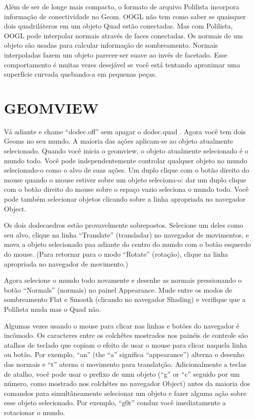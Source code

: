 \documentclass[12pt,a4paper]{book}
\begin{document}
Al\'em de ser de longe mais compacto, o formato de arquivo Polilista incorpora
informa\c{c}\~ao de conectividade no Geom.  OOGL n\~ao tem como saber
se quaisquer dois quadril\'ateros em um objeto Quad est\~ao conectadas.  Mas
com Polilista, OOGL pode interpolar normais atrav\'es de faces conectadas.
Os normais de um objeto s\~ao usadas para calcular informa\c{c}\~ao de sombreamento.
Normais interpoladas fazem um objeto parecer-ser suave ao inv\'es de facetado.
Esse comportamento \'e muitas vezes desej\'avel se voc\^e est\'a tentando aproximar uma superf\'icie
curvada quebando-a em pequenas pe\c{c}as.

\section{GEOMVIEW}

V\'a adiante e chame ``dodec.off'' sem apagar o dodec.quad .  Agora
voc\^e tem dois Geoms no seu mundo.  A maioria das a\c{c}\~oes aplicam-se ao
objeto atualmente selecionado. Quando voc\^e inicia o geomview, o objeto
atualmente selecionado \'e o mundo todo. Voc\^e pode independentemente controlar qualquer
objeto no mundo selecionado-o como o alvo de suas a\c{c}\~oes.
Um duplo clique com o bot\~ao direito do mouse quando o mouse estiver sobre um
objeto seleciona-o: dar um duplo clique com o bot\~ao direito do mouse sobre o espa\c{c}o vazio
seleciona o mundo todo. Voc\^e pode tamb\'em selecionar objetos clicando sobre a
linha apropriada no navegador Object.

Os dois dodecaedros est\~ao provavelmente sobrepostos.  Selecione um deles como
seu alvo, clique na linha ``Translate'' (transladar) no navegador de movimentos, e
mova a objeto selecionado paa adiante do centro do mundo com o bot\~ao esquerdo
do mouse.  (Para retornar para o modo ``Rotate'' (rota\c{c}\~ao), clique na linha apropriada no
navegador de movimento.)
 
Agora selecione o mundo todo novamente e desenhe as normais pressionando o
bot\~ao ``Normals'' (normais) no painel Appearance. Mude entre os modos de sombreamento
Flat e Smooth (clicando no navegador Shading) e verifique
que a Polilista muda mas o Quad n\~ao.  

Algumas vezes usando o mouse para clicar nas linhas e bot\~oes do navegador \'e
inc\^omodo. Os caracteres entre os colch\^etes mostrados nos pain\'eis de controle s\~ao
atalhos de teclado que copiam o efeito de usar o mouse para
clicar naquela linha ou bot\~ao. Por exemplo, ``an'' (the ``a'' significa
``appearance'') alterna o desenho das normais e ``t'' aterna o movimento para
translat\c{c}\~ao.  Adicionalmente a teclas de atalho, voc\^e pode usar o prefixo de umn
objeto (``g'' or ``c'' seguido por um n\'umero, como mostrado nos colch\^etes no
navegador Object) antes da maioria dos comandos para simult\^aneamente selecionar um objeto
e fazer alguma a\c{c}\~ao sobre esse objeto selecionado. Por exemplo, ``g0r'' conduz voc\^e imediatamente
a rotacionar o mundo.
\end{document}
